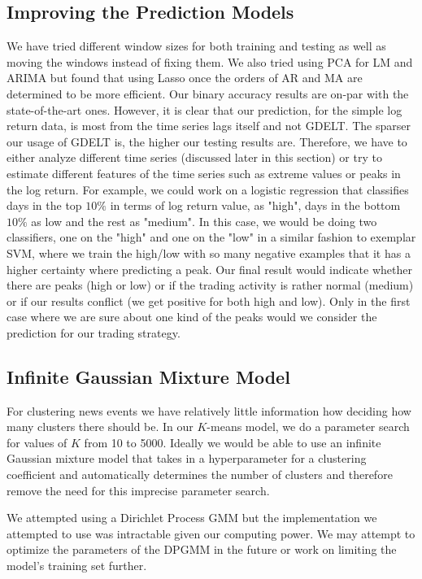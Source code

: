\subsection{Improving the Prediction Models}
We have tried different window sizes for both training and testing as well as moving the windows instead of fixing them. We also tried using PCA for LM and ARIMA but found that using Lasso once the orders of AR and MA are determined to be more efficient. Our binary accuracy results are on-par with the state-of-the-art ones. However, it is clear that our prediction, for the simple log return data, is most from the time series lags itself and not GDELT. The sparser our usage of GDELT is, the higher our testing results are. Therefore, we have to either analyze different time series (discussed later in this section) or try to estimate different features of the time series such as extreme values or peaks in the log return. For example, we could work on a logistic regression that classifies days in the top $10\%$ in terms of log return value, as "high", days in the bottom $10\%$ as low and the rest as "medium". In this case, we would be doing two classifiers, one on the "high" and one on the "low" in a similar fashion to exemplar SVM, where we train the high/low with so many negative examples that it has a higher certainty where predicting a peak. Our final result would indicate whether there are peaks (high or low) or if the trading activity is rather normal (medium) or if our results conflict (we get positive for both high and low). Only in the first case where we are sure about one kind of the peaks would we consider the prediction for our trading strategy.

\subsection{Infinite Gaussian Mixture Model}
For clustering news events we have relatively little information how deciding how many clusters there should be. In our $K$-means model, we do a parameter search for values of $K$ from 10 to 5000. Ideally we would be able to use an infinite Gaussian mixture model that takes in a hyperparameter for a clustering coefficient and automatically determines the number of clusters and therefore remove the need for this imprecise parameter search. 

We attempted using a Dirichlet Process GMM but the implementation we attempted to use was intractable given our computing power. We may attempt to optimize the parameters of the DPGMM in the future or work on limiting the model's training set further. 

